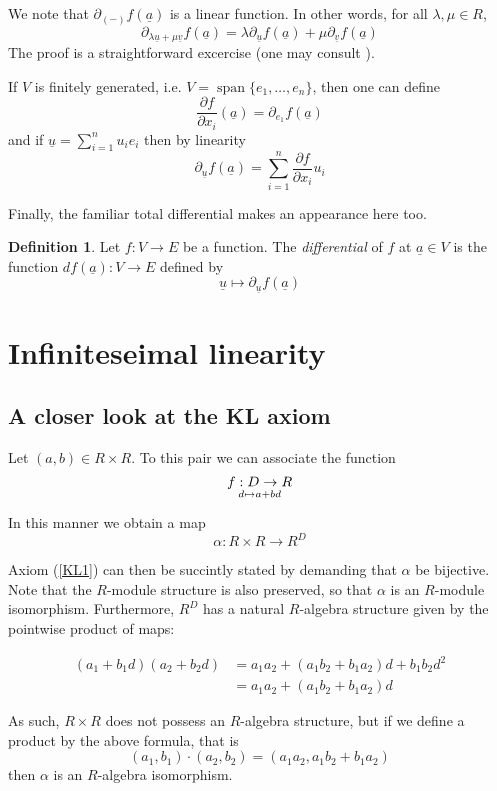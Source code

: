 \documentclass[11pt]{article}
\theoremstyle{definition}
\newtheorem{defn}{Definition}[section]
\newcommand{\ddx}[2]{\frac{\partial #1}{\partial #2}} %
\newcommand{\farg}{-} %
\renewcommand{\vec}{\underline} %
\DeclareMathOperator{\spn}{span}
\numberwithin{equation}{section}
\begin{document}
We note that \( \partial_{(\farg)}f(\vec a) \) is a linear function. In other words, for all \( \lambda,\mu \in R\),
\[
  \partial_{\lambda \vec u + \mu \vec v}f(\vec a) = \lambda\partial_{\vec u}f(\vec a) + \mu\partial_{\vec v}f(\vec a)
\]
The proof is a straightforward excercise (one may consult \cite[p. 13]{lav96}).

If \( V \) is finitely generated, i.e. \( V = \spn{\{e_1,\dots,e_n\}} \), then one can define
\[
  \ddx{f}{x_i}(\vec a) = \partial_{e_1}f(\vec a)
\]
and if \( \vec u = \sum_{i=1}^{n}{u_ie_i} \) then by linearity
\[
  \partial_{\vec u}f(\vec a) = \sum_{i=1}^{n}\ddx{f}{x_i}u_i
\]

Finally, the familiar total differential makes an appearance here too.

\begin{defn}
  Let \( f:V\to E \) be a function. The \emph{differential} of \( f \) at \( \vec a\in V \) is the function \( df(\vec a):V\to E \) defined by
  \[
    \vec u\mapsto \partial_{\vec u}f(\vec a)
  \]
\end{defn}


\section{Infiniteseimal linearity}

\subsection{A closer look at the KL axiom}

Let \( (a,b)\in R\times R \). To this pair we can associate the function
\[
  f:D\to R
  \atop
  d\mapsto a + bd
\]

In this manner we obtain a map
\[
  \alpha : R\times R\to R^D
\]

Axiom (\ref{KL1}) can then be succintly stated by demanding that \( \alpha \) be bijective. Note that the \( R \)-module structure is also preserved, so that \( \alpha \) is an \( R \)-module isomorphism. Furthermore, \( R^D \) has a natural \( R \)-algebra structure given by the pointwise product of maps:

\begin{align*}
  (a_1 + b_1d)(a_2 + b_2d) & = a_1a_2 + (a_1b_2 + b_1a_2)d + b_1b_2d^2 \\
                           & = a_1a_2 + (a_1b_2 + b_1a_2)d
\end{align*}

As such, \( R\times R \) does not possess an \( R \)-algebra structure, but if we define a product by the above formula, that is
\[
  (a_1,b_1)\cdot(a_2,b_2) = (a_1a_2,a_1b_2 + b_1a_2)
\]
then \( \alpha  \) is an \( R \)-algebra isomorphism.
\end{document}
